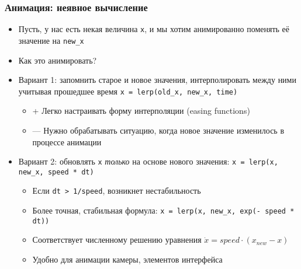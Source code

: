 \documentclass{beamer}
\begin{document}
\begin{frame}[fragile]
\frametitle{Анимация: неявное вычисление}
\begin{itemize}
\item Пусть, у нас есть некая величина \verb|x|, и мы хотим анимированно поменять её значение на \verb|new_x|
\pause
\item Как это анимировать?
\pause
\item Вариант 1: запомнить старое и новое значения, интерполировать между ними учитывая прошедшее время \verb|x = lerp(old_x, new_x, time)|
\pause
\begin{itemize}
\item {\color{green}+} Легко настраивать форму интерполяции (easing functions)
\item {\color{red}---} Нужно обрабатывать ситуацию, когда новое значение изменилось в процессе анимации
\end{itemize}
\pause
\item Вариант 2: обновлять \verb|x| \textit{только} на основе нового значения: \verb|x = lerp(x, new_x, speed * dt)|
\begin{itemize}
\item Если \verb|dt > 1/speed|, возникнет нестабильность
\item Более точная, стабильная формула: \verb|x = lerp(x, new_x, exp(- speed * dt))|
\item Соответствует численному решению уравнения \begin{math}\dot x = speed \cdot (x_{new} - x)\end{math}
\item Удобно для анимации камеры, элементов интерфейса
\end{itemize}
\end{itemize}
\end{frame}
\end{document}
